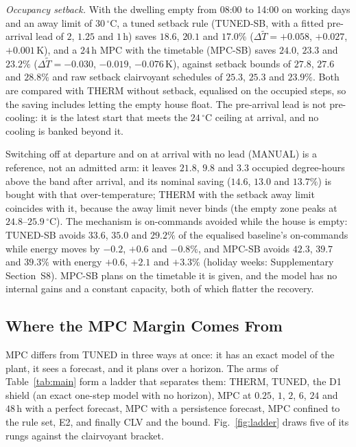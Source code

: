 \documentclass[pdflatex,sn-mathphys-num,iicol]{sn-jnl}
\theoremstyle{thmstyleone}\newtheorem{proposition}{Proposition}\newtheorem{corollary}{Corollary}
\theoremstyle{thmstyletwo}\newtheorem{remark}{Remark}\newtheorem{observation}{Observation}
\theoremstyle{thmstylethree}\newtheorem{definition}{Definition}
\begin{document}
\emph{Occupancy setback.} With the dwelling empty from 08:00 to 14:00 on working days and an away limit of $30\,^\circ$C, a tuned setback rule (TUNED-SB, with a fitted pre-arrival lead of $2$, $1.25$ and $1\,$h) saves $18.6$, $20.1$ and $17.0\%$ ($\Delta\tilde T=+0.058$, $+0.027$, $+0.001\,$K), and a $24\,$h MPC with the timetable (MPC-SB) saves $24.0$, $23.3$ and $23.2\%$ ($\Delta\tilde T=-0.030$, $-0.019$, $-0.076\,$K), against setback bounds of $27.8$, $27.6$ and $28.8\%$ and raw setback clairvoyant schedules of $25.3$, $25.3$ and $23.9\%$. Both are compared with THERM without setback, equalised on the occupied steps, so the saving includes letting the empty house float. The pre-arrival lead is not pre-cooling: it is the latest start that meets the $24\,^\circ$C ceiling at arrival, and no cooling is banked beyond it.

Switching off at departure and on at arrival with no lead (MANUAL) is a reference, not an admitted arm: it leaves $21.8$, $9.8$ and $3.3$ occupied degree-hours above the band after arrival, and its nominal saving ($14.6$, $13.0$ and $13.7\%$) is bought with that over-temperature; THERM with the setback away limit coincides with it, because the away limit never binds (the empty zone peaks at $24.8$--$25.9\,^\circ$C). The mechanism is on-commands avoided while the house is empty: TUNED-SB avoids $33.6$, $35.0$ and $29.2\%$ of the equalised baseline's on-commands while energy moves by $-0.2$, $+0.6$ and $-0.8\%$, and MPC-SB avoids $42.3$, $39.7$ and $39.3\%$ with energy $+0.6$, $+2.1$ and $+3.3\%$ (holiday weeks: Supplementary Section~S8). MPC-SB plans on the timetable it is given, and the model has no internal gains and a constant capacity, both of which flatter the recovery.


\subsection{Where the MPC Margin Comes From}
\label{subsec:ladder}

MPC differs from TUNED in three ways at once: it has an exact model of the plant, it sees a forecast, and it plans over a horizon. The arms of Table~\ref{tab:main} form a ladder that separates them: THERM, TUNED, the D1 shield (an exact one-step model with no horizon), MPC at $0.25$, $1$, $2$, $6$, $24$ and $48\,$h with a perfect forecast, MPC with a persistence forecast, MPC confined to the rule set, E2, and finally CLV and the bound. Fig.~\ref{fig:ladder} draws five of its rungs against the clairvoyant bracket.
\end{document}
